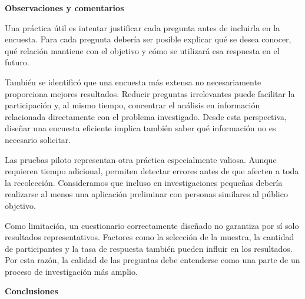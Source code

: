 \documentclass[12pt,letterpaper]{article}
\begin{document}

\textbf{Observaciones y comentarios}

Una práctica útil es intentar justificar cada pregunta antes de incluirla en la encuesta. Para cada pregunta debería ser posible explicar qué se desea conocer, qué relación mantiene con el objetivo y cómo se utilizará esa respuesta en el futuro.

También se identificó que una encuesta más extensa no necesariamente proporciona mejores resultados. Reducir preguntas irrelevantes puede facilitar la participación y, al mismo tiempo, concentrar el análisis en información relacionada directamente con el problema investigado. Desde esta perspectiva, diseñar una encuesta eficiente implica también saber qué información no es necesario solicitar.

Las pruebas piloto representan otra práctica especialmente valiosa. Aunque requieren tiempo adicional, permiten detectar errores antes de que afecten a toda la recolección. Consideramos que incluso en investigaciones pequeñas debería realizarse al menos una aplicación preliminar con personas similares al público objetivo.

Como limitación, un cuestionario correctamente diseñado no garantiza por sí solo resultados representativos. Factores como la selección de la muestra, la cantidad de participantes y la tasa de respuesta también pueden influir en los resultados. Por esta razón, la calidad de las preguntas debe entenderse como una parte de un proceso de investigación más amplio.


\textbf{Conclusiones}
\end{document}
